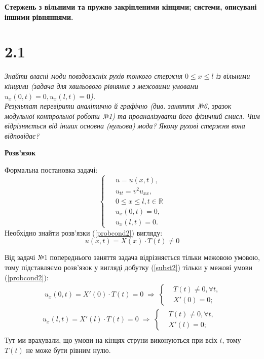 \textbf{\large Стержень з вільними та пружно закріпленими кінцями; системи, описувані іншими рівняннями.}

\section[Задача №2.1]{2.1}

\textit{Знайти власні моди повздовжніх рухів тонкого стержня $0 \leq x \leq l$ із вільними кінцями  (задача для хвильового рівняння з межовими умовами $u_x(0,t) = 0, u_x(l,t) = 0$).\\
Результат перевірити аналітично й графічно (див. заняття №6, зразок модульної контрольної роботи №1) та проаналізувати його фізичний смисл. Чим відрізняється від інших основна (нульова) мода? Якому рухові стержня вона відповідає?}

\begin{center}
    \large{\textbf{Розв'язок}}
\end{center}

\noindent Формальна постановка задачі:
\begin{equation} \label{probcond2}
    \left\{ \begin{aligned} %
            \;&u = u(x,t), \\
            &u_{tt} = v^2 u_{xx}, \\
            &0 \leq x \leq l, t \in \mathbb{R} \\
            &u_x(0,t) = 0, \\
            &u_x(l,t) = 0. 
    \end{aligned} \right.
\end{equation}
Необхідно знайти розв'язки (\ref{probcond2}) вигляду:
\begin{equation} \label{subst2}
    u(x,t) = X(x) \cdot T(t) \neq 0 
\end{equation}

Від задачі №1 попереднього заняття задача відрізняється тільки межовою умовою, тому підставляємо розв'язок у вигляді добутку (\ref{subst2}) тільки у межові умови (\ref{probcond2}):
\begin{equation*}
    \begin{aligned}
        \;u_x(0,t) = X'(0) \cdot T(t) = 0
        \;\Rightarrow\;
        \left\{ \begin{aligned}
            &T(t) \neq 0, \forall t, \\  &X'(0) = 0; 
        \end{aligned} \right.\\
        u_x(l,t) = X'(l) \cdot T(t) = 0
        \;\Rightarrow\;
        \left\{ \begin{aligned}
            &T(t) \neq 0, \forall t, \\  &X'(l) = 0; 
        \end{aligned} \right.\\
    \end{aligned}
\end{equation*}
Тут ми врахували, що умови на кінцях струни виконуються при всіх $t$, тому $T(t)$ не може бути рівним нулю.\\

